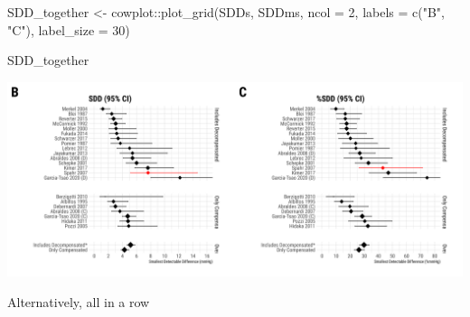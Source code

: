 \documentclass[
]{article}
\newenvironment{Shaded}{\begin{snugshade}}{\end{snugshade}}
\newcommand{\AttributeTok}[1]{\textcolor[rgb]{0.77,0.63,0.00}{#1}}
\newcommand{\DecValTok}[1]{\textcolor[rgb]{0.00,0.00,0.81}{#1}}
\newcommand{\FunctionTok}[1]{\textcolor[rgb]{0.00,0.00,0.00}{#1}}
\newcommand{\NormalTok}[1]{#1}
\newcommand{\OtherTok}[1]{\textcolor[rgb]{0.56,0.35,0.01}{#1}}
\newcommand{\SpecialCharTok}[1]{\textcolor[rgb]{0.00,0.00,0.00}{#1}}
\newcommand{\StringTok}[1]{\textcolor[rgb]{0.31,0.60,0.02}{#1}}
\begin{document}
\begin{Shaded}
\begin{Highlighting}[]
\NormalTok{SDD\_together }\OtherTok{\textless{}{-}}\NormalTok{ cowplot}\SpecialCharTok{::}\FunctionTok{plot\_grid}\NormalTok{(SDDs, SDDms, }\AttributeTok{ncol =} \DecValTok{2}\NormalTok{,}
                                   \AttributeTok{labels =} \FunctionTok{c}\NormalTok{(}\StringTok{"B"}\NormalTok{, }\StringTok{"C"}\NormalTok{),}
                                   \AttributeTok{label\_size =} \DecValTok{30}\NormalTok{)}

\NormalTok{SDD\_together}
\end{Highlighting}
\end{Shaded}

\includegraphics{figures/sdd_together_forests-1.png}

Alternatively, all in a row
\end{document}
